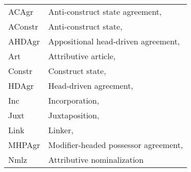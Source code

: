 \begin{table}[h!]
\begin{tabular}{ll}
ACAgr & Anti\hyp{}construct state agreement, \\
AConstr & Anti\hyp{}construct state,  \\
AHDAgr & Appositional head\hyp{}driven agreement,  \\
Art & Attributive article,  \\
Constr & Construct state,  \\
HDAgr & Head\hyp{}driven agreement,  \\
Inc & Incorporation, \\
Juxt & Juxtaposition,  \\
Link & Linker,  \\
MHPAgr & Modifier\hyp{}headed possessor agreement,  \\
Nmlz & Attributive nominalization \\
\end{tabular}
\end{table}


